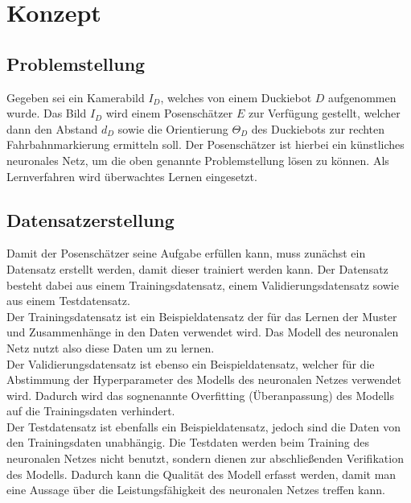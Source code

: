 \chapter{Konzept}

\section{Problemstellung}

Gegeben sei ein Kamerabild $I_D$, welches von einem Duckiebot $D$ aufgenommen wurde. Das Bild $I_D$ wird einem Posenschätzer $E$ zur Verfügung gestellt, welcher dann den Abstand $d_D$ sowie die Orientierung $\Theta_D$ des Duckiebots zur rechten 
Fahrbahnmarkierung ermitteln soll. Der Posenschätzer ist hierbei ein künstliches neuronales Netz, um die oben genannte Problemstellung lösen zu können. Als Lernverfahren wird überwachtes Lernen eingesetzt.

\section{Datensatzerstellung}

Damit der Posenschätzer seine Aufgabe erfüllen kann, muss zunächst ein Datensatz erstellt werden, damit dieser trainiert werden kann. Der Datensatz besteht dabei aus einem Trainingsdatensatz, einem Validierungsdatensatz sowie aus einem Testdatensatz. \\

Der Trainingsdatensatz ist ein Beispieldatensatz der für das Lernen der Muster und Zusammenhänge in den Daten verwendet wird. Das Modell des neuronalen Netz nutzt also diese Daten um zu lernen. \cite{datasolut} \\

Der Validierungsdatensatz ist ebenso ein Beispieldatensatz, welcher für die Abstimmung der Hyperparameter des Modells des neuronalen Netzes verwendet wird. Dadurch wird das sognenannte \glqq Overfitting\grqq{} (Überanpassung) des Modells auf die Trainingsdaten verhindert. \cite{datasolut} \\

Der Testdatensatz ist ebenfalls ein Beispieldatensatz, jedoch sind die Daten von den Trainingsdaten unabhängig. Die Testdaten werden beim Training des neuronalen Netzes nicht benutzt, sondern dienen zur abschließenden Verifikation des Modells. Dadurch kann die Qualität des Modell erfasst werden, damit man eine Aussage über die Leistungsfähigkeit des neuronalen Netzes treffen kann. \cite{datasolut} \\

